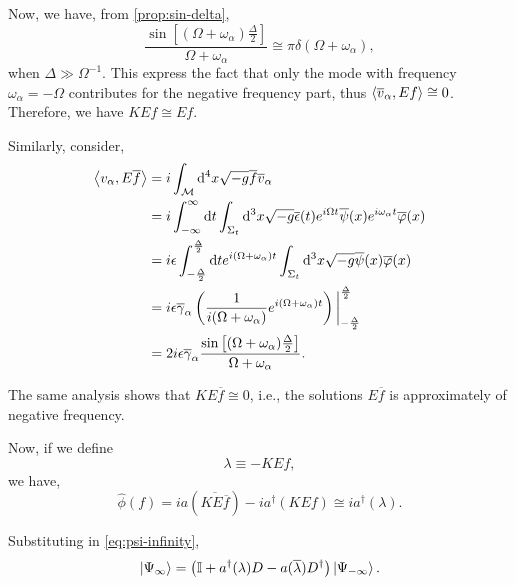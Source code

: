 Now, we have, from \cref{prop:sin-delta},
\begin{equation}
    \frac{\sin{\left[(\Omega+\omega_\alpha)\frac{\Delta}{2}\right]}}{\Omega+\omega_\alpha}\cong\pi\delta(\Omega+\omega_\alpha),
\end{equation}
when \(\Delta\gg\Omega^{-1}\). This express the fact that only the mode with frequency \(\omega_\alpha=-\Omega\) contributes for the negative frequency part, thus \(\left\langle \overline{v}_\alpha, Ef\right\rangle\cong0\). Therefore, we have \(KEf\cong Ef\). 

Similarly, consider,
\begin{subequations}
    \begin{align}
        \left\langle v_{\alpha}, E\overline{f}\right\rangle&=i\int_{{\mathcal{M}}}\mathrm{d}^4x\sqrt{-g}\overline{f}\overline{v}_{\alpha}\\
        &=i\int_{-\infty}^{\infty}\mathrm{d} t\int_{\Sigma_t}\mathrm{d}^3x\sqrt{-g}\overline{\epsilon}(t)e^{i\Omega t}\overline{\psi}(x)e^{i\omega_\alpha t}\overline{\varphi}(x)\\
        &=i\epsilon\int_{-\frac{\Delta}{2}}^{\frac{\Delta}{2}}\mathrm{d} te^{i(\Omega+\omega_\alpha) t}\int_{\Sigma_t}\mathrm{d}^3x\sqrt{-g}\overline{\psi}(x)\overline{\varphi}(x)\\
        &=i\epsilon\overline{\gamma}_\alpha\left(\frac{1}{i(\Omega+\omega_\alpha)}e^{i(\Omega+\omega_\alpha)t}\right)\bigg\vert_{-\frac{\Delta}{2}}^{\frac{\Delta}{2}}\\
        &=2i\epsilon\overline{\gamma}_\alpha\frac{\sin{\left[(\Omega+\omega_\alpha)\frac{\Delta}{2}\right]}}{\Omega+\omega_\alpha}.
    \end{align}
\end{subequations}

The same analysis shows that \(KE\overline{f}\cong0\), i.e., the solutions \(E\overline{f}\) is approximately of negative frequency.

Now, if we define
\begin{equation}
    \lambda\equiv-KEf,
\end{equation}
we have,
\begin{equation}
    \hat{\phi}(f)=ia\left(\overline{KE\overline{f}}\right)-ia^{\dagger}\left(KEf\right)\cong ia^{\dagger}(\lambda).
\end{equation}

Substituting in \cref{eq:psi-infinity},
\begin{equation}\label{eq:detector-evolution}
    \ket{\Psi_{\infty}}=\left({\mathbb{I}}+a^{\dagger}(\lambda)D-a(\overline{\lambda})D^{\dagger}\right)\ket{\Psi_{-\infty}}.
\end{equation}

